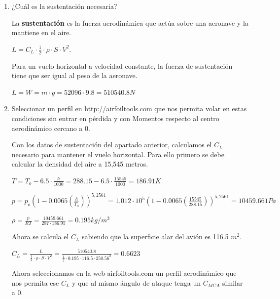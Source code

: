 \documentclass{article}
\begin{document}
    \begin{enumerate}
        \item ¿Cuál es la sustentación necesaria?
        
        \bigskip
        La \textbf{sustentaci\'on} es la fuerza aerodinámica que actúa sobre una aeronave y la mantiene en el aire.
        \begin{center}
            $L = C_{L} \cdot \frac{1}{2} \cdot \rho \cdot S \cdot V^2$.
        \end{center}

        Para un vuelo horizontal a velocidad constante, la fuerza de sustentación tiene que ser igual al peso de la aeronave.
        \begin{center}
            $L = W = m \cdot g = 52096 \cdot 9.8 = 510540.8 N$
        \end{center}
        
        \item Seleccionar un perfil en http://airfoiltools.com que nos permita volar en estas
        condiciones sin entrar en pérdida y con Momentos respecto al centro aerodinámico
        cercano a 0.

        \bigskip
        Con los datos de sustentación del apartado anterior, calculamos el $C_{L}$ necesario para mantener el vuelo horizontal.
        \newline
        Para ello primero se debe calcular la densidad del aire a 15,545 metros.
        \begin{center}
            $T = T_{o} - 6.5 \cdot \frac{h}{1000} = 288.15 - 6.5 \cdot \frac{15545}{1000} = 186.91K$
        
            $p = p_{o}(1 - 0.0065(\frac{h}{T_{o}}))^{5,2561} = 1.012 \cdot 10^5(1 - 0.0065(\frac{15545}{288.15}))^{5,2561} = 10459.661Pa$
            
            $\rho = \frac{p}{RT} = \frac{10459.661}{287 \cdot 186.91} = 0.195 kg/m^3$
        \end{center}
        Ahora se calcula el $C_{L}$ sabiendo que la superficie alar del avión es 116.5 $m^2$.
        \begin{center}
            $C_{L} = \frac{L}{\frac{1}{2} \cdot \rho \cdot S \cdot V^2} = \frac{510540.8}{\frac{1}{2} \cdot 0.195 \cdot 116.5 \cdot 250.56^2} = 0.6623$
        \end{center}

        Ahora seleccionamos en la web airfoiltools.com un perfil aerodinámico que nos
        permita ese $C_{L}$ y que al mismo ángulo de ataque tenga un $C_{MCA}$ similar a 0.


\end{enumerate}
\end{document}
